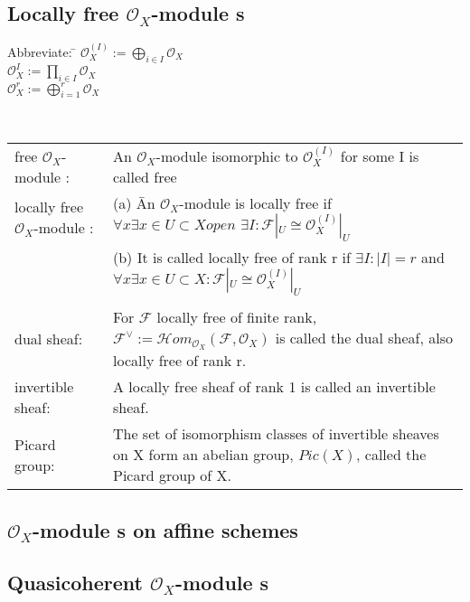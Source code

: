 \documentclass[a4paper, 12pt]{article}
\newcommand{\ca}[1]{\mathcal{#1}}
\newcommand{\caf}{\mathcal{F}}
\newcommand{\oxmod}{$\mathcal{O}_X$-module }
\newcommand{\ox}{\mathcal{O}_X}
\begin{document}
\subsection{Locally free \oxmod s}

\begin{tabbing}
  Abbreviate:     \= $\ox^{(I)} := \bigoplus_{i \in I} \ox $\\
  \>$  \ox^I := \prod_{i \in I} \ox $\\
  \> $ \ox^r := \bigoplus^{r}_{i=1}\ox$
\end{tabbing}
\\

\begin{tabular}{p{4cm} p{12cm}}

free \oxmod: & An \oxmod   isomorphic to $\ox^{(I)}$ for some I is called free\\

locally free \oxmod: 

   &(a) \= An \oxmod is locally free if $\forall x  \exists  x\in U \subset X open $ $\exists I : \caf|_U \cong \ox^{(I)}|_U$\\
   &(b) \> It is called locally free of rank r if $\exists I : |I| = r $   and $ \forall x \exists x \in U \subset X : \caf|_U \cong \ox^{(I)}|_U$\\
\\

dual sheaf: & For $\caf$ locally free of finite rank, $\caf^{\vee} := \ca{H}om_{\ox}(\caf, \ox)$ is called the dual sheaf, also locally free of rank r.\\


invertible sheaf: & A locally free sheaf of rank 1 is called an invertible sheaf.\\


Picard group: & The set of isomorphism classes of invertible sheaves on X form an abelian group, $Pic(X)$, called the Picard group of X.\\


\end{tabular}

\subsection{\oxmod s on affine schemes}

\subsection{Quasicoherent \oxmod s }
\end{document}
